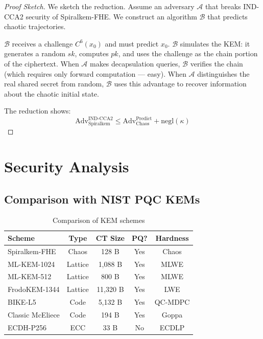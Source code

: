 \documentclass{article}
\begin{document}
\begin{proof}[Proof Sketch]
We sketch the reduction. Assume an adversary $\mathcal{A}$ that breaks IND-CCA2 security of Spiralkem-FHE. We construct an algorithm $\mathcal{B}$ that predicts chaotic trajectories.

$\mathcal{B}$ receives a challenge $C^6(x_0)$ and must predict $x_0$. $\mathcal{B}$ simulates the KEM: it generates a random $sk$, computes $pk$, and uses the challenge as the chain portion of the ciphertext. When $\mathcal{A}$ makes decapsulation queries, $\mathcal{B}$ verifies the chain (which requires only forward computation — easy). When $\mathcal{A}$ distinguishes the real shared secret from random, $\mathcal{B}$ uses this advantage to recover information about the chaotic initial state.

The reduction shows:
\begin{equation}
\text{Adv}_{\text{Spiralkem}}^{\text{IND-CCA2}} \leq \text{Adv}_{\text{Chaos}}^{\text{Predict}} + \text{negl}(\kappa)
\end{equation}
\end{proof}

\section{Security Analysis}

\subsection{Comparison with NIST PQC KEMs}

\begin{table}[H]
\centering
\begin{tabular}{|l|c|c|c|c|}
\hline
\textbf{Scheme} & \textbf{Type} & \textbf{CT Size} & \textbf{PQ?} & \textbf{Hardness} \\
\hline
Spiralkem-FHE & Chaos & 128 B & Yes & Chaos \\
ML-KEM-1024 & Lattice & 1,088 B & Yes & MLWE \\
ML-KEM-512 & Lattice & 800 B & Yes & MLWE \\
FrodoKEM-1344 & Lattice & 11,320 B & Yes & LWE \\
BIKE-L5 & Code & 5,132 B & Yes & QC-MDPC \\
Classic McEliece & Code & 194 B & Yes & Goppa \\
ECDH-P256 & ECC & 33 B & No & ECDLP \\
\hline
\end{tabular}
\caption{Comparison of KEM schemes}
\end{table}
\end{document}
